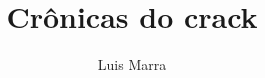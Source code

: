 \documentclass[12pt]{extarticle}
\begin{document}
\newcommand{\AutorLivro}{Luis Marra}
\newcommand{\TituloLivro}{Crônicas do crack}
\newcommand{\Tema}{Diálogos com a sociologia e com a antropologia}
\newcommand{\Genero}{Conto, crônica e novela}
\newcommand{\imagemCapa}{./images/PNLD0027-01.png}
\newcommand{\issnppub}{978-65-89810-09-4}
\newcommand{\issnepub}{978-65-89810-07-0}
\newcommand{\colaborador}{{Eduardo Modesto de Carvalho, Bruno Gradella e Vicente Castro}}


\title{\TituloLivro}
\author{\AutorLivro}
\def\authornotes{\colaborador}

\date{}
\maketitle

\baselineskip\par
\end{document}

